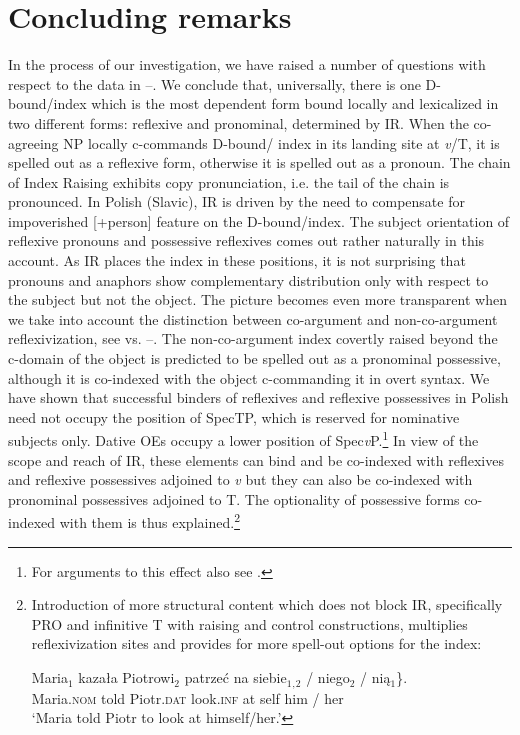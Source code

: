 \documentclass[output=paper,modfonts,nonflat
]{langsci/langscibook}
\begin{document}
\section{Concluding remarks}\label{sec:witkos:s4}

In the process of our investigation, we have raised a number of questions with respect to the data in --. We conclude that, universally, there is one D-bound/index which is the most dependent form bound locally and lexicalized in two different forms: reflexive and pronominal, determined by IR. When the co-agreeing NP locally c-commands D-bound/ index in its landing site at \textit{v}/T, it is spelled out as a reflexive form, otherwise it is spelled out as a pronoun. The chain of Index Raising exhibits copy pronunciation, i.e. the tail of the chain is pronounced. In Polish (Slavic), IR is driven by the need to compensate for impoverished [+person] feature on the D-bound/index. The subject orientation of reflexive pronouns and possessive reflexives comes out rather naturally in this account. As IR places the index in these positions, it is not surprising that pronouns and anaphors show complementary distribution only with respect to the subject but not the object. The picture becomes even more transparent when we take into account the distinction between co-argument and non-co-argument reflexivization, see  vs. --. The non-co-argument index covertly raised beyond the c-domain of the object is predicted to be spelled out as a pronominal possessive, although it is co-indexed with the object c-commanding it in overt syntax. We have shown that successful binders of reflexives and reflexive possessives in Polish need not occupy the position of SpecTP, which is reserved for nominative subjects only. Dative OEs occupy a lower position of Spec\textit{v}P.\footnote{\label{fn36}For arguments to this effect also see \cite{citkoetal2018}.} In view of the scope and reach of IR, these elements can bind and be co-indexed with reflexives and reflexive possessives adjoined to \textit{v} but they can also be co-indexed with pronominal possessives adjoined to T. The optionality of possessive forms co-indexed with them is thus explained.\footnote{\label{fn37}Introduction of more structural content which does not block IR, specifically PRO and infinitive T with raising and control constructions, multiplies reflexivization sites and provides for more spell-out options for the index:

\ea
\gll Maria$_1$ kazała Piotrowi$_2$ patrzeć na \minsp{\{} siebie$_1$$_,$$_2$ / \minsp{*} niego$_2$ / nią$_1$\}.\\
Maria.\textsc{nom} told Piotr.\textsc{dat} look.\textsc{inf} at {} self {} {} him / her\\
\glt `Maria told Piotr to look at himself/her.’
\z
        
}
\end{document}

